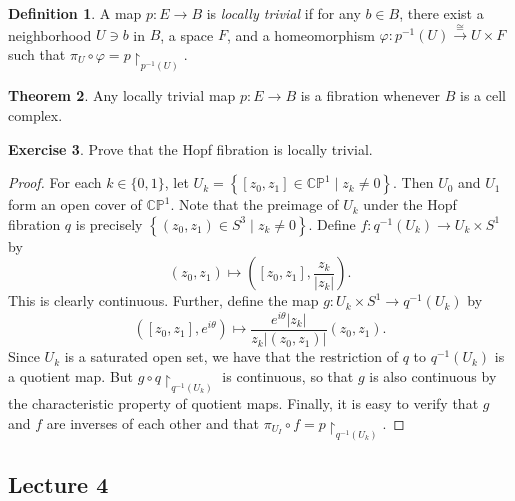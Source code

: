 \documentclass[10pt,letterpaper,cm]{nupset}
\theoremstyle{definition}
\newtheorem{defn}{Definition}[subsection]
\theoremstyle{theorem}
\newtheorem{theorem}[defn]{Theorem}
\newtheorem{exercise}[defn]{Exercise}
\theoremstyle{remark}
\newcommand{\CP}{\mathbb{CP}}
\newcommand{\1}{\mathbb{1}}
\newcommand{\0}{\vec 0}
\begin{document}
\begin{defn}\label{ltriv}
A map $p : E \to B$ is \textit{locally trivial} if for any $b\in B$, there exist a neighborhood $U\ni b$ in $B$, a space $F$, and a homeomorphism $\varphi: p^{-1}(U) \overset{\cong}{\longrightarrow} U \times F$ such that $\pi_U \circ \varphi = p \restriction_{p^{-1}(U)}$.
\end{defn}

\begin{theorem}
Any locally trivial map $p: E \to B$ is a fibration whenever $B$ is a cell complex. 
\end{theorem}

\begin{exercise}
Prove that the Hopf fibration is locally trivial.
\end{exercise}
\begin{proof}
For each $k \in \{0,1\}$, let $U_k = \left\{\left[z_0, z_1\right] \in \CP^1 \mid z_k \ne 0\right\}$. Then $U_0$ and $U_1$ form an open cover of $\CP^1$. Note that the preimage of $U_k$ under the Hopf fibration $q$ is precisely $\left\{\left(z_0, z_1\right) \in S^3 \mid z_k \ne 0\right\}$. Define $f: q^{-1}(U_k) \to  U_k \times S^1$ by  $$\left(z_0, z_1\right) \mapsto \left(\left[z_0, z_1\right], \frac{z_k}{|z_k|}\right).$$ This is clearly continuous. Further, define the map $g: U_k \times S^1 \to q^{-1}(U_k)$ by $$\left([z_0, z_1], e^{i{\theta}}\right) \mapsto \frac{e^{i\theta}|z_k|}{z_k \left\lvert{(z_0, z_1)}\right\rvert}\left(z_0, z_1 \right).$$ Since $U_k$ is a saturated open set, we have that the restriction of $q$ to $q^{-1}(U_k)$ is a quotient map. But $g \circ q\restriction_{q^{-1}(U_k)}$ is continuous, so that $g$ is also continuous by the characteristic property of quotient maps. Finally, it is easy to verify that $g$ and $f$ are inverses of each other and that $\pi_{U_I} \circ f = p\restriction_{q^{-1}(U_k)}$.
\end{proof}

\subsection{Lecture 4}
\end{document}
